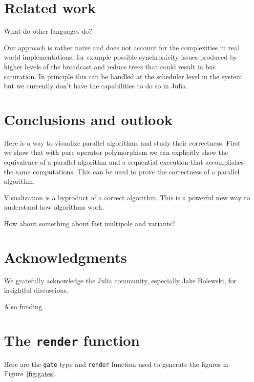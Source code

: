 \documentclass{sig-alternate}
\newcommand{\code}[1]{\texttt{#1}}
\begin{document}
\section{Related work}

What do other languages do?

Our approach is rather naive and does not account for the complexities in real world implementations, for example possible synchronicity issues produced by higher levels of the broadcast and reduce trees that could result in bus saturation. In principle this can be handled at the scheduler level in the system but we currently don't have the capabilities to do so in Julia.

\section{Conclusions and outlook}

Here is a way to visualize parallel algorithms and study their correctness. First we show that with pure operator polymorphism we can explicitly show the equivalence of a parallel algorithm and a sequential execution that accomplishes the same computations. This can be used to prove the correctness of a parallel algorithm.

Visualization is a byproduct of a correct algorithm. This is a powerful new way to understand how algorithms work.

How about something about fast multipole and variants?

\section{Acknowledgments}
We gratefully acknowledge the Julia community, especially Jake Bolewski, for insightful discussions.

Also funding.




\appendix

\section{The \code{render} function}
\label{sec:render}

Here are the \code{gate} type and \code{render} function used to generate the figures in Figure~\ref{fig:gates}.
\end{document}
